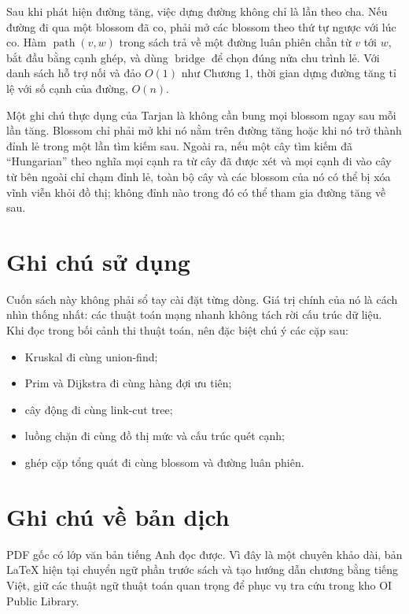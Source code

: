 \documentclass[11pt]{article}
\begin{document}
Sau khi phát hiện đường tăng, việc dựng đường không chỉ là lần theo cha. Nếu đường
đi qua một blossom đã co, phải mở các blossom theo thứ tự ngược với lúc co. Hàm
\(\operatorname{path}(v,w)\) trong sách trả về một đường luân phiên chẵn từ \(v\)
tới \(w\), bắt đầu bằng cạnh ghép, và dùng \(\operatorname{bridge}\) để chọn đúng
nửa chu trình lẻ. Với danh sách hỗ trợ nối và đảo \(O(1)\) như Chương 1, thời gian
dựng đường tăng tỉ lệ với số cạnh của đường, \(O(n)\).

Một ghi chú thực dụng của Tarjan là không cần bung mọi blossom ngay sau mỗi lần
tăng. Blossom chỉ phải mở khi nó nằm trên đường tăng hoặc khi nó trở thành đỉnh
lẻ trong một lần tìm kiếm sau. Ngoài ra, nếu một cây tìm kiếm đã ``Hungarian''
theo nghĩa mọi cạnh ra từ cây đã được xét và mọi cạnh đi vào cây từ bên ngoài chỉ
chạm đỉnh lẻ, toàn bộ cây và các blossom của nó có thể bị xóa vĩnh viễn khỏi đồ
thị; không đỉnh nào trong đó có thể tham gia đường tăng về sau.

\section{Ghi chú sử dụng}

Cuốn sách này không phải sổ tay cài đặt từng dòng. Giá trị chính của nó là
cách nhìn thống nhất: các thuật toán mạng nhanh không tách rời cấu trúc dữ
liệu. Khi đọc trong bối cảnh thi thuật toán, nên đặc biệt chú ý các cặp sau:
\begin{itemize}
  \item Kruskal đi cùng union-find;
  \item Prim và Dijkstra đi cùng hàng đợi ưu tiên;
  \item cây động đi cùng link-cut tree;
  \item luồng chặn đi cùng đồ thị mức và cấu trúc quét cạnh;
  \item ghép cặp tổng quát đi cùng blossom và đường luân phiên.
\end{itemize}

\section*{Ghi chú về bản dịch}

PDF gốc có lớp văn bản tiếng Anh đọc được. Vì đây là một chuyên khảo dài, bản
LaTeX hiện tại chuyển ngữ phần trước sách và tạo hướng dẫn chương bằng tiếng
Việt, giữ các thuật ngữ thuật toán quan trọng để phục vụ tra cứu trong kho OI
Public Library.
\end{document}
